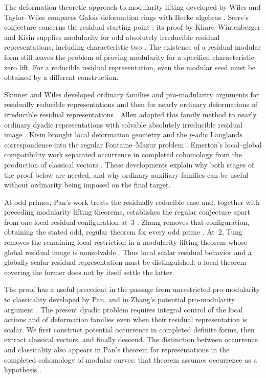 The deformation-theoretic approach to modularity lifting developed
by Wiles and Taylor--Wiles compares Galois deformation rings with
Hecke algebras \cite{Wiles1995,TaylorWiles1995}. Serre's conjecture
concerns the residual starting point \cite{Serre1987}; its proof by
Khare--Wintenberger and Kisin supplies modularity for odd absolutely
irreducible residual representations, including characteristic two
\cite{KhareWintenberger2009,KhareWintenberger2009II,Kisin2009}.
The existence of a residual modular form still leaves the problem
of proving modularity for a specified characteristic-zero lift.
For a reducible residual representation, even the modular seed
must be obtained by a different construction.

Skinner and Wiles developed ordinary families and pro-modularity
arguments for residually reducible representations and then for
nearly ordinary deformations of irreducible residual representations
\cite{SkinnerWiles1999,SkinnerWiles2001}. Allen adapted this family
method to nearly ordinary dyadic representations with solvable
absolutely irreducible residual image \cite{Allen2014}.
Kisin brought local deformation geometry and the $p$-adic
Langlands correspondence into the regular Fontaine--Mazur problem
\cite{Kisin2009FM}. Emerton's local--global compatibility work
separated occurrence in completed cohomology from the production
of classical vectors \cite{Emerton2011}. These developments
explain why both stages of the proof below are needed, and why
ordinary auxiliary families can be useful without ordinarity
being imposed on the final target.

At odd primes, Pan's work treats the residually reducible case and,
together with preceding modularity lifting theorems, establishes the
regular conjecture apart from one local residual configuration at~$3$
\cite[Theorems~1.0.2 and~1.0.4]{Pan2022}. Zhang removes that
configuration, obtaining the stated odd, regular theorem for every
odd prime \cite[Theorem~1.0.2]{Zhang2025}. At~$2$, Tung removes
the remaining local restriction in a modularity lifting theorem whose
global residual image is nonsolvable
\cite[Theorem~A]{Tung2021Dyadic}. Thus local scalar residual
behavior and a globally scalar residual representation must be
distinguished: a local theorem covering the former does not by
itself settle the latter.

The proof has a useful precedent in the passage from unrestricted
pro-modularity to classicality developed by Pan, and in Zhang's
potential pro-modularity argument \cite{Pan2022,Zhang2025}.
The present dyadic problem requires integral control of the local
actions and of deformation families even when their residual
representation is scalar. We first construct potential occurrence
in completed definite forms, then extract classical vectors, and
finally descend. The distinction between occurrence and classicality
also appears in Pan's theorem for representations in the completed
cohomology of modular curves: that theorem assumes occurrence as
a hypothesis \cite[Theorem~7.1.2]{Pan2026Classicality}.

